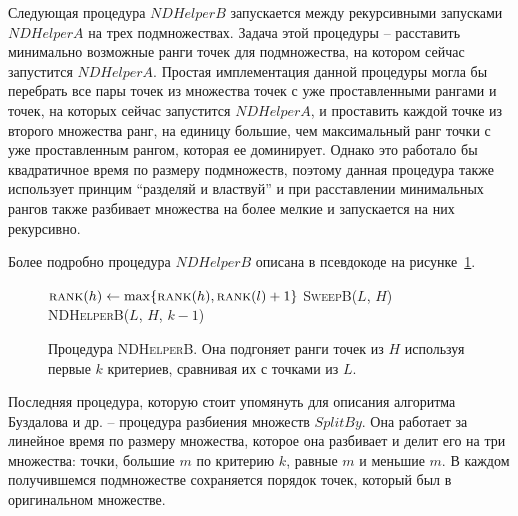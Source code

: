 Следующая процедура $NDHelperB$ запускается между рекурсивными запусками $NDHelperA$ на трех подмножествах. 
Задача этой процедуры -- расставить минимально возможные ранги точек для подмножества, на котором сейчас 
запустится $NDHelperA$. Простая имплементация данной процедуры могла бы перебрать все пары точек из множества
точек с уже проставленными рангами и точек, на которых сейчас запустится $NDHelperA$, и проставить каждой точке 
из  второго множества ранг, на единицу большие, чем максимальный ранг точки с уже проставленным рангом, которая 
ее доминирует. Однако это работало бы квадратичное время по размеру подмножеств, поэтому данная процедура также
использует принцим ``разделяй и властвуй'' и при расставлении минимальных рангов также разбивает множества на
более мелкие и запускается на них рекурсивно.

Более подробно процедура $NDHelperB$ описана в псевдокоде на рисунке~\ref{nd-helper-b}.

\begin{figure}
\begin{algorithmic}[1]
     \Return
                \State $\textsc{rank}(h) \gets \max\{\textsc{rank}(h), \textsc{rank}(l) + 1\}$
            \EndIf
        \EndFor
        \State \textsc{SweepB}($L$, $H$)
        \State \textsc{NDHelperB}($L$, $H$, $k - 1$)
        \State{}
        \State{}
        \State{}
        \State{}
        \State{}
        \State{}
        \State{}
        \State{}
    \EndIf
\EndProcedure
\end{algorithmic}
\caption{Процедура \textsc{NDHelperB}. Она подгоняет ранги точек из $H$ 
         используя первые $k$ критериев, сравнивая их с точками из $L$.}
\label{nd-helper-b}
\end{figure}

Последняя процедура, которую стоит упомянуть для описания алгоритма Буздалова и др. -- 
процедура разбиения множеств $SplitBy$. Она работает за линейное время по размеру множества, которое
она разбивает и делит его на три множества: точки, большие $m$ по критерию $k$, равные $m$
и меньшие $m$. В каждом получившемся подмножестве сохраняется порядок точек, который был в
оригинальном множестве.

